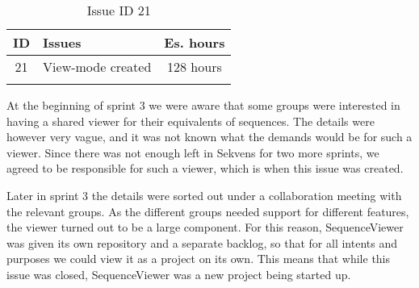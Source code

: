 \begin{longtable} { | c | p{12cm} | c | } 
\hline
	ID 	&	Issues	&		 Es. hours \\\hline
	21 	&	View-mode created	&	128 hours \\\hline
\caption{Issue ID 21}
\label{tab:spr3_viewmodecreated}
\end{longtable}

At the beginning of sprint 3 we were aware that some groups were interested in having a shared viewer for their equivalents of sequences. The details were however very vague, and it was not known what the demands would be for such a viewer. Since there was not enough left in Sekvens for two more sprints, we agreed to be responsible for such a viewer, which is when this issue was created.

Later in sprint 3 the details were sorted out under a collaboration meeting with the relevant groups. As the different groups needed support for different features, the viewer turned out to be a large component. For this reason, SequenceViewer was given its own repository and a separate backlog, so that for all intents and purposes we could view it as a project on its own. This means that while this issue was closed, SequenceViewer was a new project being started up. 